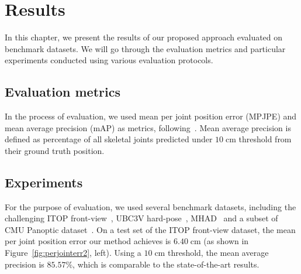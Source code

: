 \chapter{Results}\label{chap:results}

In this chapter, we present the results of our proposed approach evaluated on benchmark datasets. We will go through the evaluation metrics and particular experiments conducted using various evaluation protocols.\par

\section{Evaluation metrics}
In the process of evaluation, we used mean per joint position error (MPJPE) and mean average precision (mAP) as metrics, following~\cite{Ali19,haque2016viewpoint,Marin18jvcir,Shafaei16}. Mean average precision is defined as percentage of all skeletal joints predicted under $10 \; \mbox{cm}$ threshold from their ground truth position.\par

\section{Experiments}



For the purpose of evaluation, we used several benchmark datasets, including the challenging ITOP front-view~\cite{haque2016viewpoint}, UBC3V hard-pose~\cite{Shafaei16}, MHAD~\cite{Vidal:2013:BMC:2478277.2478412} and a subset of CMU Panoptic dataset~\cite{Joo_2017_TPAMI}. On a test set of the ITOP front-view dataset, the mean per joint position error our method achieves is $6.40 \; \mbox{cm}$ (as shown in Figure~\ref{fig:perjointerr2}, left). Using a $10 \; \mbox{cm}$ threshold, the mean average precision is $85.57\%$, which is comparable to the state-of-the-art results.\par %
\vspace{5mm}

